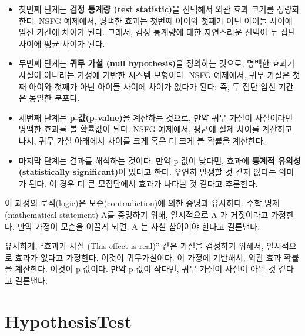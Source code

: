 \begin{itemize}

\item 첫번째 단계는 {\bf 검정 통계량 (test statistic)}을 선택해서 
외관 효과 크기를 정량화한다. NSFG 예제에서, 명백한 효과는 첫번째 아이와 첫째가 아닌 아이들 사이에 임신 기간에 차이가 된다. 그래서, 검정 통계량에 대한 자연스러운 선택이
두 집단 사이에 평균 차이가 된다.

\item 두번째 단계는 {\bf 귀무 가설 (null hypothesis)}을 정의하는 것으로,
명백한 효과가 사실이 아니라는 가정에 기반한 시스템 모형이다.
NSFG 예제에서, 귀무 가설은 첫째 아이와 첫째가 아닌 아이들 사이에 차이가 없다가 된다;
즉, 두 집단 임신 기간은 동일한 분포다. 

\item 세번째 단계는 {\bf p-값(p-value)}을 계산하는 것으로, 만약 귀무 가설이 사실이라면 명백한 효과를 볼 확률값이 된다. NSFG 예제에서, 평균에 실제 차이를 계산하고 나서, 귀무 가설 아래에서 차이를 크게 혹은 더 크게 볼 확률을 계산한다.

\item 마지막 단계는 결과를 해석하는 것이다. 만약 p-값이 낮다면, 효과에 
{\bf 통계적 유의성 (statistically significant)}이 있다고 한다.
우연히 발생할 것 같지 않다는 의미가 된다. 이 경우 더 큰 모집단에서 효과가 나타날 것 같다고 추론한다. 

\end{itemize}

이 과정의 로직(logic)은 모순(contradiction)에 의한 증명과 유사하다. 
수학 명제(mathematical statement) A를 증명하기 위해, 일시적으로 A 가 거짓이라고 가정한다.
만약 가정이 모순을 이끌게 되면, A 는 사실 참이어야 한다고 결론낸다.


유사하게, ``효과가 사실 (This effect is real)'' 같은 가설을 검정하기 위해서,
일시적으로 효과가 없다고 가정한다. 이것이 귀무가설이다.
이 가정에 기반해서, 외관 효과 확률을 계산한다. 이것이 p-값이다.
만약 p-값이 작다면, 귀무 가설이 사실이 아닐 것 같다고 결론낸다.



\section{HypothesisTest}
\label{hypotest}

